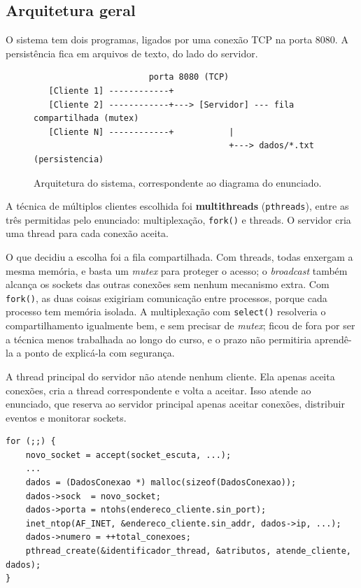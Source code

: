 \documentclass[12pt,a4paper]{article}
\begin{document}
\subsection{Arquitetura geral}

O sistema tem dois programas, ligados por uma conexão TCP na porta 8080. A
persistência fica em arquivos de texto, do lado do servidor.

\begin{figure}[H]
\centering
\begin{minipage}{0.9\textwidth}
\ttfamily\footnotesize
\begin{verbatim}
                       porta 8080 (TCP)
   [Cliente 1] ------------+
   [Cliente 2] ------------+---> [Servidor] --- fila compartilhada (mutex)
   [Cliente N] ------------+           |
                                       +---> dados/*.txt (persistencia)
\end{verbatim}
\end{minipage}
\caption{Arquitetura do sistema, correspondente ao diagrama do enunciado.}
\end{figure}

A técnica de múltiplos clientes escolhida foi \textbf{multithreads}
(\texttt{pthreads}), entre as três permitidas pelo enunciado: multiplexação,
\texttt{fork()} e threads. O servidor cria uma thread para cada conexão aceita.

O que decidiu a escolha foi a fila compartilhada. Com threads, todas enxergam a
mesma memória, e basta um \textit{mutex} para proteger o acesso; o
\textit{broadcast} também alcança os sockets das outras conexões sem nenhum
mecanismo extra. Com \texttt{fork()}, as duas coisas exigiriam comunicação entre
processos, porque cada processo tem memória isolada. A multiplexação com
\texttt{select()} resolveria o compartilhamento igualmente bem, e sem precisar de
\textit{mutex}; ficou de fora por ser a técnica menos trabalhada ao longo do
curso, e o prazo não permitiria aprendê-la a ponto de explicá-la com segurança.

A thread principal do servidor não atende nenhum cliente. Ela apenas aceita
conexões, cria a thread correspondente e volta a aceitar. Isso atende ao
enunciado, que reserva ao servidor principal apenas aceitar conexões, distribuir
eventos e monitorar sockets.

\begin{lstlisting}[caption={Laço principal do servidor, em \texttt{servidor.c}. A thread criada recebe uma \texttt{struct} própria, com o socket, o IP e a porta de origem e o número da conexão.}]
for (;;) {
    novo_socket = accept(socket_escuta, ...);
    ...
    dados = (DadosConexao *) malloc(sizeof(DadosConexao));
    dados->sock  = novo_socket;
    dados->porta = ntohs(endereco_cliente.sin_port);
    inet_ntop(AF_INET, &endereco_cliente.sin_addr, dados->ip, ...);
    dados->numero = ++total_conexoes;
    pthread_create(&identificador_thread, &atributos, atende_cliente, dados);
}
\end{lstlisting}
\end{document}
